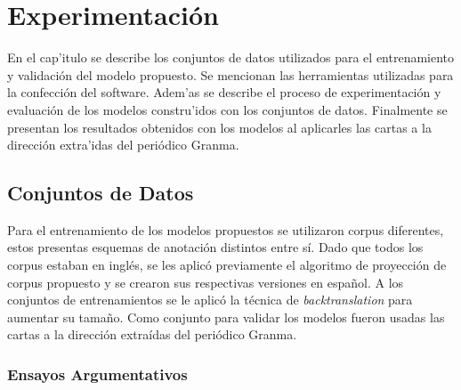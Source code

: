 \chapter{Experimentación}\label{chapter:implementation}


En el cap'itulo se describe los conjuntos de datos utilizados para el entrenamiento y validación del modelo 
propuesto. Se mencionan las herramientas utilizadas para la confección del software. Adem'as se describe el 
proceso de experimentación y evaluación de los modelos constru'idos con los conjuntos de datos. Finalmente
se presentan los resultados obtenidos con los modelos al aplicarles las cartas a la dirección extra'idas 
del periódico Granma. 

\section{Conjuntos de Datos}

Para el entrenamiento de los modelos propuestos se utilizaron corpus diferentes, estos
presentas esquemas de anotación distintos entre sí. Dado que todos los corpus estaban en inglés, 
se les aplicó previamente el algoritmo de proyección de corpus propuesto y se crearon sus respectivas
versiones en español. A los conjuntos de entrenamientos se le aplicó la técnica de \emph{backtranslation}
para aumentar su tamaño. Como conjunto para validar los modelos fueron usadas las cartas a la dirección
extraídas del periódico Granma.

\subsection{Ensayos Argumentativos}\label{corpus:persuasive_essays}

